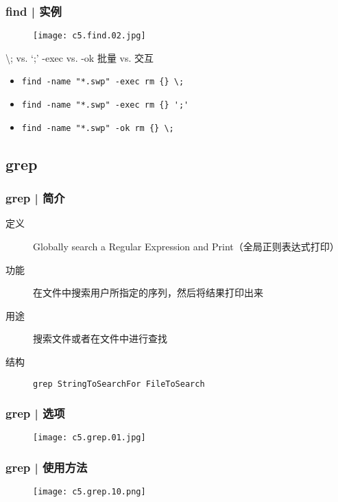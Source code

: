 \begin{frame}[fragile]
  \frametitle{find | \alert{实例}}
  \begin{figure}
    \centering
    \texttt{[image: c5.find.02.jpg]}
  \end{figure}
  \pause
  \begin{block}{\textbackslash; vs. `;' \qquad -exec vs. -ok \quad 批量 vs. 交互}
  \begin{itemize}
    \item \verb|find -name "*.swp" -exec rm {} \;|
    \item \verb|find -name "*.swp" -exec rm {} ';'|
    \item \verb|find -name "*.swp" -ok rm {} \;|
  \end{itemize}
  \end{block}
\end{frame}

\subsection{grep}
\begin{frame}[fragile]
  \frametitle{grep | 简介}
  \begin{description}
    \item[定义] Globally search a Regular Expression and Print（全局正则表达式打印）
    \item[功能] 在文件中搜索用户所指定的序列，然后将结果打印出来
    \item[用途] 搜索文件或者在文件中进行查找
    \item[结构] \verb|grep StringToSearchFor FileToSearch|
  \end{description}
\end{frame}

\begin{frame}
  \frametitle{grep | \alert{选项}}
  \begin{figure}
    \centering
    \texttt{[image: c5.grep.01.jpg]}
  \end{figure}
\end{frame}

\begin{frame}
  \frametitle{grep | 使用方法}
  \begin{figure}
    \centering
    \texttt{[image: c5.grep.10.png]}
  \end{figure}
\end{frame}



